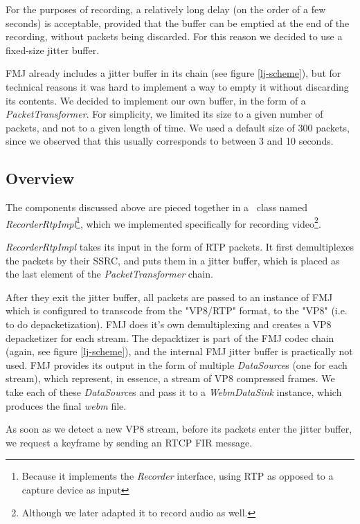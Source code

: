 \documentclass[twoside,openright,a4paper,12pt,english]{article}
\begin{document}
For the purposes of recording, a relatively long delay (on the order of a few
seconds) is acceptable, provided that the buffer can be emptied at the end of the recording,
without packets being discarded. For this reason we decided to use a fixed-size
jitter buffer.

FMJ already includes a jitter buffer in its chain (see figure \ref{lj-scheme}), but
for technical reasons it was hard to implement a way to empty it without
discarding its contents. We decided to implement our own buffer, in the form of
a \emph{PacketTransformer}. For simplicity, we limited its size to a given
number of packets, and not to a given length of time. We used a default size
of 300 packets, since we observed that this usually corresponds to between 3
and 10 seconds.

\subsection{Overview}
\label{recording-video-overview}

The components discussed above are pieced together in a \lj\ class named
\emph{RecorderRtpImpl}\footnote{Because it implements the \emph{Recorder}
interface, using RTP as opposed to a capture device as input},
which we implemented specifically for recording video\footnote{Although we
later adapted it to record audio as well.}.

\emph{RecorderRtpImpl} takes its input in the form of RTP
packets. It first demultiplexes the packets by their SSRC, and puts them in a jitter
buffer, which is placed as the last element of the \emph{PacketTransformer} chain.

After they exit the jitter buffer, all packets
are passed to an instance of FMJ which is configured to transcode from the
"VP8/RTP" format, to the "VP8" (i.e. to do depacketization). FMJ does it's own
demultiplexing and creates a VP8 depacketizer for each stream. The depacktizer
is part of the FMJ codec chain (again, see figure \ref{lj-scheme}), and the
internal FMJ jitter buffer is practically not used. FMJ provides its output in the
form of multiple \emph{DataSource}s (one for each stream), which represent, in
essence, a stream of VP8 compressed frames. We take each of these
\emph{DataSource}s and pass it to a \emph{WebmDataSink} instance, which
produces the final \emph{webm} file.

As soon as we detect a new VP8 stream, before its packets enter the jitter
buffer, we request a keyframe by sending an RTCP FIR message. 
\end{document}
